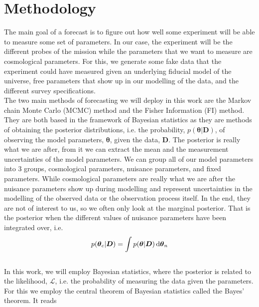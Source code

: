 \documentclass[../main.tex]{subfiles}
\begin{document}
\chapter{Methodology}
The main goal of a forecast is to figure out how well some experiment will be able to measure some set of parameters. In our case, the experiment will be the different probes of the \Euclid mission while the parameters that we want to measure are cosmological parameters. For this, we generate some fake data that the experiment could have measured given an underlying fiducial model of the universe, free parameters that show up in our modelling of the data, and the different survey specifications.\\
The two main methods of forecasting we will deploy in this work are the Markov chain Monte Carlo (MCMC) method and the Fisher Information (FI) method. They are both based in the framework of Bayesian statistics as they are methods of obtaining the posterior distributions, i.e. the probability, $p(\boldsymbol{\theta}|\boldsymbol{D})$, of observing the model parameters, $\boldsymbol{\theta}$, given the data, $\boldsymbol{D}$. The posterior is really what we are after, from it we can extract the mean and the measurement uncertainties of the model parameters. We can group all of our model parameters into 3 groups, cosmological parameters, nuisance parameters, and fixed parameters. While cosmological parameters are really what we are after the nuisance parameters show up during modelling and represent uncertainties in the modelling of the observed data or the observation process itself. In the end, they are not of interest to us, so we often only look at the marginal posterior. That is the posterior when the different values of nuisance parameters have been integrated over, i.e. \begin{equation}
    \label{eq:bayes-theorem}
    p(\boldsymbol{\theta}_c|\boldsymbol{D}) = \int p(\boldsymbol{\theta}|\boldsymbol{D})\,\mathrm{d} \boldsymbol{\theta}_n
\end{equation}\\
In this work, we will employ Bayesian statistics, where the posterior is related to the likelihood, $\mathcal{L}$, i.e. the probability of measuring the data given the parameters. For this we employ the central theorem of Bayesian statistics called the Bayes' theorem. It reads 
\end{document}
